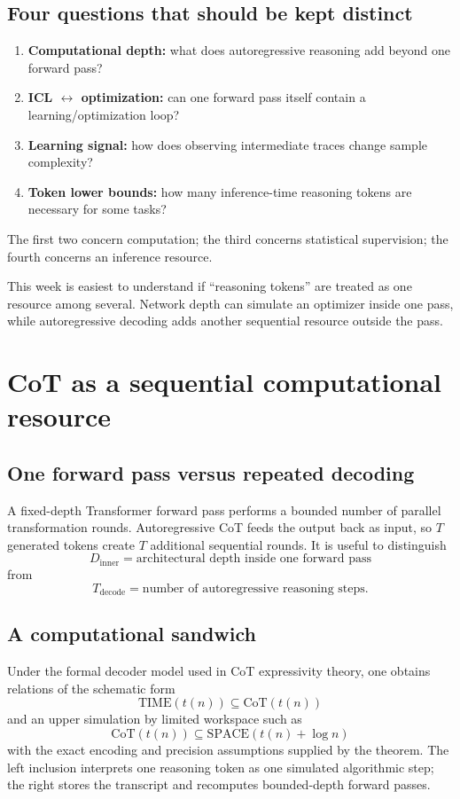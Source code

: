 \documentclass[11pt,a4paper,oneside,openany]{memoir}
\theoremstyle{definition}
\begin{document}
\section{Four questions that should be kept distinct}
\begin{enumerate}
\item \textbf{Computational depth:} what does autoregressive reasoning add beyond one forward pass?
\item \textbf{ICL $\leftrightarrow$ optimization:} can one forward pass itself contain a learning/optimization loop?
\item \textbf{Learning signal:} how does observing intermediate traces change sample complexity?
\item \textbf{Token lower bounds:} how many inference-time reasoning tokens are necessary for some tasks?
\end{enumerate}
The first two concern computation; the third concerns statistical supervision; the fourth concerns an inference resource.

\begin{presentbox}
This week is easiest to understand if ``reasoning tokens'' are treated as one resource among several.  Network depth can simulate an optimizer inside one pass, while autoregressive decoding adds another sequential resource outside the pass.
\end{presentbox}

\chapter{CoT as a sequential computational resource}
\section{One forward pass versus repeated decoding}
A fixed-depth Transformer forward pass performs a bounded number of parallel transformation rounds.  Autoregressive CoT feeds the output back as input, so $T$ generated tokens create $T$ additional sequential rounds.  It is useful to distinguish
\[
D_{\mathrm{inner}}=\text{architectural depth inside one forward pass}
\]
from
\[
T_{\mathrm{decode}}=\text{number of autoregressive reasoning steps}.
\]

\section{A computational sandwich}
Under the formal decoder model used in CoT expressivity theory, one obtains relations of the schematic form
\[
\boxed{\mathrm{TIME}(t(n))\subseteq\mathrm{CoT}(t(n))}
\]
and an upper simulation by limited workspace such as
\[
\boxed{\mathrm{CoT}(t(n))\subseteq\mathrm{SPACE}(t(n)+\log n)}
\]
with the exact encoding and precision assumptions supplied by the theorem.  The left inclusion interprets one reasoning token as one simulated algorithmic step; the right stores the transcript and recomputes bounded-depth forward passes.
\end{document}
